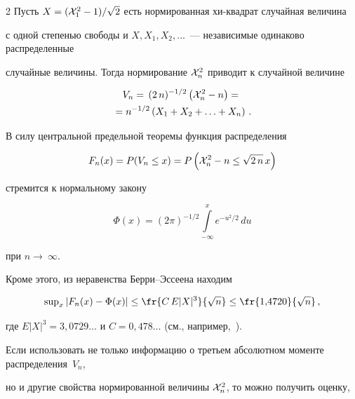 \begin{multicols}{2}
Пусть $X= ({\cal X}_1^2 - 1)/\sqrt{2}$ есть нормированная хи-квадрат случайная величина 


с одной степенью свободы и   $X, X_1, X_2,\ldots$~--- независимые одинаково распределенные 


случайные величины. Тогда нормирование  ${\cal X}_n^2$ приводит к случайной величине


\begin{multline*}


V_n =\,(2\,n)^{-1/2}\left({\cal X}_n^2-n\right)= {}\\


{}=n^{-1/2}\left(X_1 + X_2 + \ldots + X_n\right)\,. 


\end{multline*}


В силу центральной предельной теоремы функция распределения


$$ 


F_n(x) = P(V_n \leq x)=P\left({\cal X}_n^2-n \leq \sqrt{2\,n}\,x\right)


$$


стремится к нормальному закону   


$$ 


\Phi(x) =  (2\pi)^{-1/2} \int\limits_{- \infty}^x e^{-u^2/2}\,du 


$$


при $n \rightarrow~\infty$.





Кроме этого, из неравенства Берри--Эссеена находим





\noindent


\begin{equation}


\label{g1a}


\sup\nolimits_x |F_n(x) - \Phi(x)| \leq \fr{C\,E|X|^3 }{ \sqrt{n}} \leq \fr{1{,}4720}{\sqrt{n}}\,,


\end{equation}


где $E|X|^3 = 3{,}0729\ldots$ и $C = 0{,}478\ldots$ (см., например,~\cite{3-cr, 4-cr}).


%


Если использовать не только информацию о третьем абсолютном моменте распределения~$V_n$, 


но и другие свойства   нормированной величины  ${\cal X}_n^2$, то можно получить оценку, 



\end{multicols}
